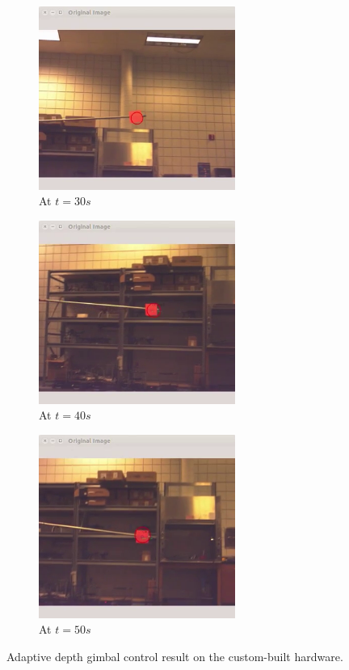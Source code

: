 \begin{figure}[htbp]
\begin{subfigure}{0.5\textwidth}
		\centering
		\includegraphics[height=6cm]{images/chapter2/gimbal_hardware_4.png}
		\caption{At $t=30s$}
	\end{subfigure}	
	\begin{subfigure}{0.5\textwidth}
		\centering
		\includegraphics[height=6cm]{images/chapter2/gimbal_hardware_5.png}
		\caption{At $t=40s$}
	\end{subfigure}%
	\begin{subfigure}{0.5\textwidth}
		\centering
		\includegraphics[height=6cm]{images/chapter2/gimbal_hardware_6.png}
		\caption{At $t=50s$}
	\end{subfigure}	
	\caption{Adaptive depth gimbal control result on the custom-built hardware.}
	\label{gimbal_hardware_result}
\end{figure}

